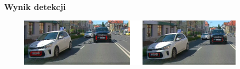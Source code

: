 \documentclass{beamer}
\begin{document}
%


    \begin{frame}
        \frametitle{Wynik detekcji}
        \begin{figure}
            \includegraphics[scale=0.3]{../WIZUT-Dyplom-styl/Pictures/non_max_supression}
        \end{figure}
    \end{frame}
\end{document}
